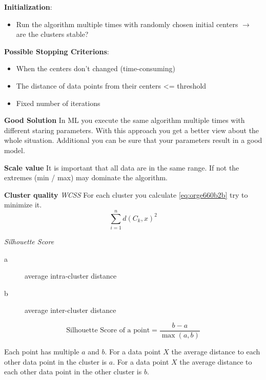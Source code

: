 \documentclass[11pt,twoside,landscape]{article}
\begin{document}
\begin{multicols}{3}
\textbf{Initialization}:
\begin{itemize}
\item Run the algorithm multiple times with randomly chosen initial centers \(\rightarrow\) are the clusters stable?
\end{itemize}


\textbf{Possible Stopping Criterions}:
\begin{itemize}
\item When the centers don't changed (time-consuming)
\item The distance of data points from their centers <= threshold
\item Fixed number of iterations
\end{itemize}


\textbf{Good Solution}
In ML you execute the same algorithm multiple times with different staring parameters.
With this approach you get a better view about the whole situation.
Additional you can be sure that your parameters result in a good model.


\textbf{Scale value}
It is important that all data are in the same range.
If not the extremes (min / max) may dominate the algorithm.


\textbf{Cluster quality}
\emph{WCSS}
For each cluster you calculate \ref{eq:orge660b2b} try to minimize it.
\begin{equation}
\label{eq:orge660b2b}
\sum_{i=1}^n d(C_k, x)^2
\end{equation}

\emph{Silhouette Score}
\begin{description}
\item[{a}] average intra-cluster distance
\item[{b}] average inter-cluster distance
\end{description}
\begin{equation}
  \text{Silhouette Score of a point} = \frac{b-a}{\max(a,b)}
\end{equation}

Each point has multiple \(a\) and \(b\).
For a data point \(X\) the average distance to each other data point in the cluster is \(a\).
For a data point \(X\) the average distance to each other data point in the other cluster is \(b\).



\end{multicols}
\end{document}
